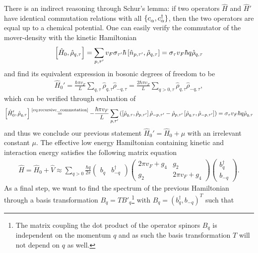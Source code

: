 There is an indirect reasoning through Schur's lemma: if two operators $\hat H$ and $\hat H'$ have identical commutation relations with all $\{c^\pdag_\alpha,c^\dag_\alpha\}$, then the two operators are equal up to a chemical potential.
One can easily verify the commutator of the mover-density with the kinetic Hamiltonian
\begin{align}
    \left[ \hat H_0, \hat\rho_{q,\tau} \right]
    =
    \sum_{p,\tau'}v_F\sigma_{\tau'}\hbar \left[ \hat n_{p,\tau'},\hat\rho_{q,\tau} \right]
    =
    \sigma_\tau v_F \hbar q \hat\rho_{q,\tau}
\end{align}
and find its equivalent expression in bosonic degrees of freedom to be
\begin{align}
    \hat H_0' = \frac{\hbar \pi v_F}L\sum_{q,\tau}\hat\rho_{q,\tau}\hat\rho_{-q,\tau} = \frac{2\hbar\pi v_F}L\sum_{q>0,\tau}\hat\rho_{q,\tau}\hat\rho_{-q,\tau},
\end{align}
which can be verified through evaluation of
\begin{align}
    \commutator{\hat H_0',\hat\rho_{q,\tau}}
    \overset{\text{\cref{eq:recursive_commutation}}}{=}
    -\frac{\hbar \pi v_F}L
    \sum_{p,\tau'}
    \brlr{
    \commutator{\hat\rho_{q,\tau},\hat\rho_{p,\tau'}}\hat\rho_{-p,\tau'}
    -
    \hat\rho_{p,\tau'}\commutator{\hat\rho_{q,\tau},\hat\rho_{-p,\tau'}}
    }
    =
    \sigma_\tau v_F \hbar q\hat\rho_{q,\tau}
\end{align}
and thus we conclude our previous statement $\hat H_0' = \hat H_0 + \mu$ with an irrelevant constant $\mu$.
The effective low energy Hamiltonian containing kinetic and interaction energy satisfies the following matrix equation
\begin{align}
    \hat H = \hat H_0 + \hat V \approx
    \sum_{q>0}\frac{\hbar q}{2\pi}
    \begin{pmatrix}
        b_q & b^\dag_{-q}
    \end{pmatrix}
    \begin{pmatrix}
        2\pi v_F + g_4 & g_2 \\
        g_2 & 2\pi v_F + g_4
    \end{pmatrix}
    \begin{pmatrix}
        b^\dag_q \\ b_{-q}
    \end{pmatrix}
    .
    \label{eq:luttinger_hamiltonian_nondiagonal}
\end{align}
As a final step, we want to find the spectrum of the previous Hamiltonian through a basis transformation $B_q = T B'_q$\footnote{The matrix coupling the dot product of the operator spinors $B_q$ is independent on the momentum $q$ and as such the basis transformation $T$ will not depend on $q$ as well.} with $B_q = (b_q^\dag, b_{-q})^T$ such that
